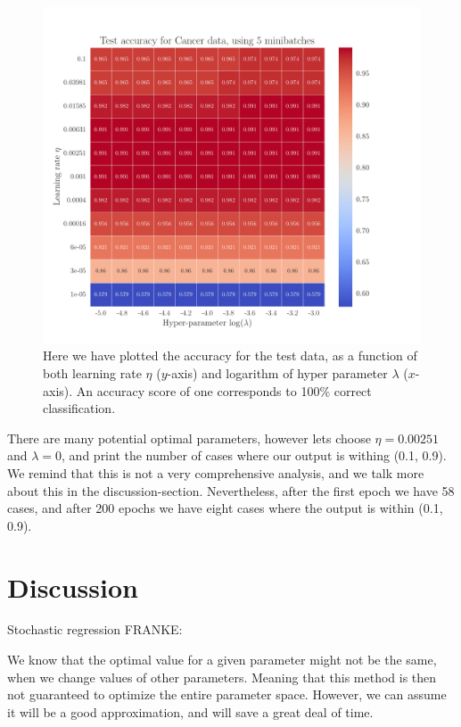 \documentclass[12pt]{extarticle}
\begin{document}
\begin{figure}[h]
	\includegraphics[width=\linewidth]{../output/plots/reg_Cancer__lambda_eta__Test_accuracy__860729.pdf}
	\caption{Here we have plotted the accuracy for the test data, as a function of both learning rate $\eta$ ($y$-axis) and logarithm of hyper parameter $\lambda$ ($x$-axis). An accuracy score of one corresponds to 100\% correct classification.}\label{fig:logreg_eta_lambda}
\end{figure}

There are many potential optimal parameters, however lets choose $\eta= 0.00251$ and $\lambda = 0$, and print the number of cases where our output is withing (0.1, 0.9). We remind that this is not a very comprehensive analysis, and we talk more about this in the discussion-section. Nevertheless, after the first epoch we have 58 cases, and after 200 epochs we have eight cases where the output is within (0.1, 0.9).

\clearpage

\section{Discussion}

Stochastic regression FRANKE:

We know that the optimal value for a given parameter might not be the same, when we change values of other parameters. Meaning that this method is then not guaranteed to optimize the entire parameter space. However, we can assume it will be a good approximation, and will save a great deal of time.
\end{document}
